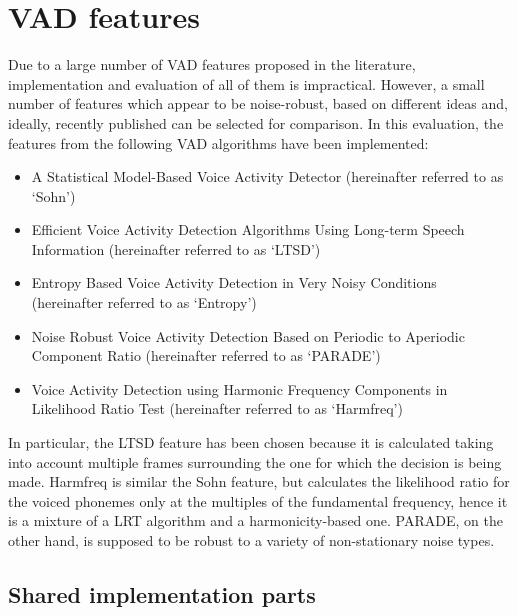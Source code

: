 
\section{VAD features}

Due to a large number of VAD features proposed in the literature, implementation and evaluation of all of them is impractical. However, a small number of features which appear to be noise-robust, based on different ideas and, ideally, recently published can be selected for comparison. In this evaluation, the features from the following VAD algorithms have been implemented:

\begin{itemize}
\item A Statistical Model-Based Voice Activity Detector \cite{Sohn} (hereinafter referred to as `Sohn')
\item Efficient Voice Activity Detection Algorithms Using Long-term Speech Information \cite{LTSD} (hereinafter referred to as `LTSD')
\item Entropy Based Voice Activity Detection in Very Noisy Conditions \citep{Renevey} (hereinafter referred to as `Entropy')
\item Noise Robust Voice Activity Detection Based on Periodic to Aperiodic Component Ratio \cite{PARADE} (hereinafter referred to as `PARADE')
\item Voice Activity Detection using Harmonic Frequency Components in Likelihood Ratio Test \cite{Tan} (hereinafter referred to as `Harmfreq')
\end{itemize}

In particular, the LTSD feature has been chosen because it is calculated taking into account multiple frames surrounding the one for which the decision is being made. Harmfreq is similar the Sohn feature, but calculates the likelihood ratio for the voiced phonemes only at the multiples of the fundamental frequency, hence it is a mixture of a LRT algorithm and a harmonicity-based one. PARADE, on the other hand, is supposed to be robust to a variety of non-stationary noise types.

\subsection{Shared implementation parts}

